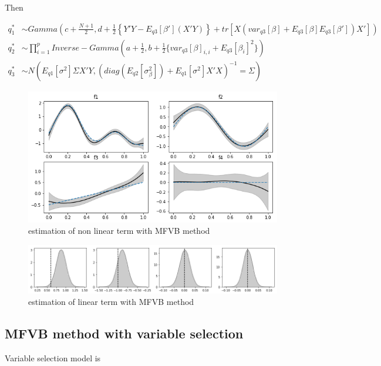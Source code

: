 \documentclass[11pt]{article}
\begin{document}
	Then
	
	\begin{align*}
	q_1^* &\sim Gamma\left(c + \frac{N+1}{2}, d + \frac{1}{2}\left\{Y'Y -E_{q3}[\beta'](X'Y)\right\} + tr\left[X(var_{q3}[\beta]+E_{q3}[\beta]E_{q3}[\beta'])X'\right]\right)\\
	q_2^* &\sim \prod_{i=1}^{p}Inverse-Gamma( a+ \frac{1}{2}, b + \frac{1}{2}\{var_{q3}[\beta]_{i,i} +E_{q3}[\beta_i]^2 \})\\
	q_3^* &\sim N\left(E_{q1}[\sigma^2]\Sigma X'Y,\left(diag(E_{q2}[\sigma_{\beta}^2]) + E_{q1}[\sigma^2]X'X \right)^{-1} = \Sigma \right)
	\end{align*}
	
	\begin{figure}
		\centering
		\includegraphics[width=1\linewidth]{nonlinear_mfvb}
		\caption{estimation of non linear term with MFVB method}
		\label{fig:nonlinearmfvb}
	\end{figure}
	
	\begin{figure}
		\centering
		\includegraphics[width=1\linewidth]{linear_mfvb}
		\caption{estimation of linear term with MFVB method}
		\label{fig:linearmfvb}
	\end{figure}
	
	\subsection{MFVB method with variable selection}
	
	Variable selection model is
	
\end{document}
